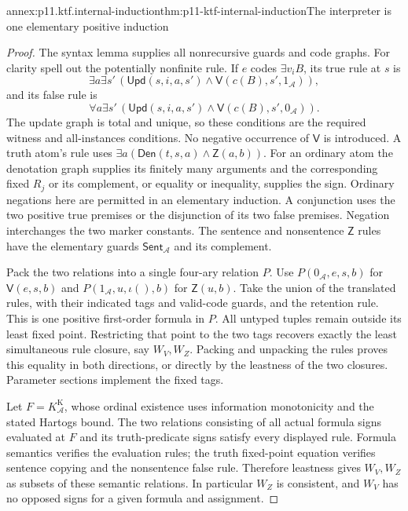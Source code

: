 \begin{annexitem}{annex:p11.ktf.internal-induction}{thm:p11-ktf-internal-induction}{The interpreter is one elementary positive induction}
\begin{proof}
The syntax lemma supplies all nonrecursive guards and code graphs.
For clarity spell out the potentially nonfinite rule. If \(e\)
codes \(\exists v_i B\), its true rule at \(s\) is
\[
 \exists a\exists s'\,
 (\mathsf{Upd}(s,i,a,s')\land
       \mathsf V(c(B),s',1_{\mathcal A})),
\]
and its false rule is
\[
 \forall a\exists s'\,
 (\mathsf{Upd}(s,i,a,s')\land
       \mathsf V(c(B),s',0_{\mathcal A})).
\]
The update graph is total and unique, so these conditions are the
required witness and all-instances conditions. No negative occurrence
of \(\mathsf V\) is introduced. A truth atom's rule uses
\(\exists a(\mathsf{Den}(t,s,a)\land\mathsf Z(a,b))\).
For an ordinary atom the denotation graph supplies its finitely many
arguments and the corresponding fixed \(R_j\) or its complement,
or equality or inequality, supplies the sign. Ordinary negations here
are permitted in an elementary induction. A conjunction uses the
two positive true premises or the disjunction of its two false premises.
Negation interchanges the two marker constants. The sentence and
nonsentence \(\mathsf Z\) rules have the elementary guards
\(\mathsf{Sent}_{\mathcal A}\) and its complement.

Pack the two relations into a single four-ary relation \(P\).
Use \(P(0_{\mathcal A},e,s,b)\) for \(\mathsf V(e,s,b)\)
and \(P(1_{\mathcal A},u,\iota(),b)\) for
\(\mathsf Z(u,b)\). Take the union of the translated rules,
with their indicated tags and valid-code guards, and the retention
rule. This is one positive first-order formula in \(P\).
All untyped tuples remain outside its least fixed point. Restricting
that point to the two tags recovers exactly the least simultaneous
rule closure, say \(W_V,W_Z\). Packing and unpacking the rules
proves this equality in both directions, or directly by the leastness
of the two closures. Parameter sections implement the fixed tags.

Let \(F=K_{\mathcal A}^{\mathrm K}\), whose ordinal existence
uses information monotonicity and the stated Hartogs bound. The two
relations consisting of all actual formula signs evaluated at \(F\)
and its truth-predicate signs satisfy every displayed rule. Formula
semantics verifies the evaluation rules; the truth fixed-point equation
verifies sentence copying and the nonsentence false rule. Therefore
leastness gives \(W_V,W_Z\) as subsets of these semantic relations.
In particular \(W_Z\) is consistent, and \(W_V\) has no
opposed signs for a given formula and assignment.


\end{proof}
\end{annexitem}
